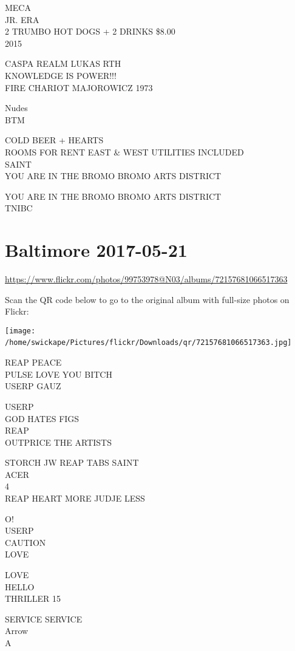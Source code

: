\documentclass[10pt,letterpaper]{article}
\begin{document}
MECA\\
JR. ERA\\
2 TRUMBO HOT DOGS + 2 DRINKS \$8.00\\
2015

CASPA REALM LUKAS RTH\\
KNOWLEDGE IS POWER!!!\\
FIRE CHARIOT MAJOROWICZ 1973

Nudes\\
BTM

COLD BEER + HEARTS\\
ROOMS FOR RENT EAST \& WEST UTILITIES INCLUDED\\
SAINT\\
YOU ARE IN THE BROMO BROMO ARTS DISTRICT

YOU ARE IN THE BROMO BROMO ARTS DISTRICT\\
TNIBC
\

\section*{Baltimore 2017-05-21}

\url{https://www.flickr.com/photos/99753978@N03/albums/72157681066517363}

Scan the QR code below to go to the original album with full-size photos on Flickr:

\texttt{[image: /home/swickape/Pictures/flickr/Downloads/qr/72157681066517363.jpg]}
\

REAP PEACE\\
PULSE LOVE YOU BITCH\\
USERP GAUZ

USERP\\
GOD HATES FIGS\\
REAP\\
OUTPRICE THE ARTISTS

STORCH JW REAP TABS SAINT\\
ACER\\
4\\
REAP HEART MORE JUDJE LESS

O!\\
USERP\\
CAUTION\\
LOVE

LOVE\\
HELLO\\
THRILLER 15

SERVICE SERVICE\\
Arrow\\
A
\end{document}
